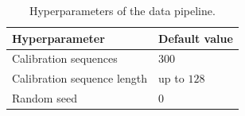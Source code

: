 \begin{table}[h]
\centering
\caption{Hyperparameters of the data pipeline.}
\begin{tabular}{ll}
\toprule
Hyperparameter & Default value \\
\midrule
Calibration sequences                          & $300$ \\
Calibration sequence length                    & up to $128$ \\
Random seed                                    & $0$ \\
\bottomrule
\end{tabular}
\end{table}

